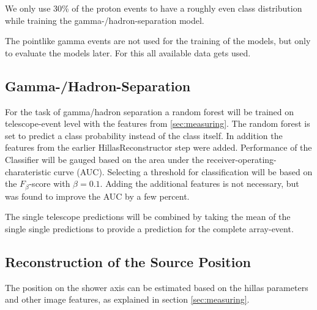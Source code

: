 We only use 30\% of the proton events to have a roughly even class distribution while training 
the gamma-/hadron-separation model.

The pointlike gamma events are not used for the training of the models,
but only to evaluate the models later.
For this all available data gets used.

\subsection{Gamma-/Hadron-Separation}
\label{sec:gh_sep}

For the task of gamma/hadron separation a random forest will be trained
on telescope-event level with the features from \ref{sec:measuring}.
The random forest is set to predict a class probability instead of
the class itself. 
In addition the features from the earlier
HillasReconstructor step were added.
Performance of the Classifier will be gauged based 
on the area under the receiver-operating-charateristic curve (AUC).
Selecting a threshold for classification will be based on
the $F_{\beta}$-score with $\beta = 0.1$.
Adding the additional features is not necessary, but was found to improve
the AUC by a few percent.

The single telescope predictions will be combined by
taking the mean of the single
single predictions to provide a prediction for the complete
array-event.




\subsection{Reconstruction of the Source Position}
\label{sec:source_position}

The position on the shower axis can be estimated based on 
the hillas parameters and other image features, as 
explained in section \ref{sec:measuring}.

